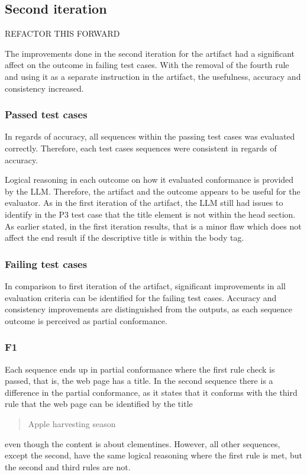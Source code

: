 \subsection{Second iteration}

REFACTOR THIS FORWARD

The improvements done in the second iteration for the artifact had a significant affect on the outcome in failing test cases. With the removal of the fourth rule and using it as a separate instruction in the artifact, the usefulness, accuracy and consistency increased.

\subsubsection{Passed test cases}

In regards of accuracy, all sequences within the passing test cases was evaluated correctly. Therefore, each test cases sequences were consistent in regards of accuracy.

Logical reasoning in each outcome on how it evaluated conformance is provided by the LLM. Therefore, the artifact and the outcome appears to be useful for the evaluator. As in the first iteration of the artifact, the LLM still had issues to identify in the P3 test case that the title element is not within the head section. As earlier stated, in the first iteration results, that is a minor flaw which does not affect the end result if the descriptive title is within the body tag.

\subsubsection{Failing test cases}

In comparison to first iteration of the artifact, significant improvements in all evaluation criteria can be identified for the failing test cases. Accuracy and consistency improvements are distinguished from the outputs, as each sequence outcome is perceived as partial conformance. 

\subsubsection{F1}

Each sequence ends up in partial conformance where the first rule check is passed, that is, the web page has a title. In the second sequence there is a difference in the partial conformance, as it states that it conforms with the third rule that the web page can be identified by the title \blockquote{Apple harvesting season} even though the content is about clementines. However, all other sequences, except the second, have the same logical reasoning where the first rule is met, but the second and third rules are not.

